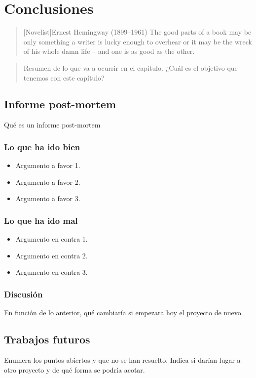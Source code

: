 \chapter{Conclusiones}

\begin{quotation}[Novelist]{Ernest Hemingway (1899--1961)}
The good parts of a book may be only something a writer is lucky enough to overhear or it may be the wreck of his whole damn life -- and one is as good as the other.
\end{quotation}

\begin{abstract}
Resumen de lo que va a ocurrir en el capítulo. ¿Cuál es el objetivo que tenemos con este capítulo?
\end{abstract}

\section{Informe post-mortem}

Qué es un informe post-mortem

\subsection{Lo que ha ido bien}

\begin{itemize}
\item Argumento a favor 1.

\item Argumento a favor 2.

\item Argumento a favor 3.
\end{itemize}

\subsection{Lo que ha ido mal}

\begin{itemize}
\item Argumento en contra 1.

\item Argumento en contra 2.

\item Argumento en contra 3.
\end{itemize}

\subsection{Discusión}

En función de lo anterior, qué cambiaría si empezara hoy el proyecto de nuevo.

\section{Trabajos futuros}

Enumera los puntos abiertos y que no se han resuelto. Indica si darían lugar a otro proyecto y de qué forma se podría acotar.